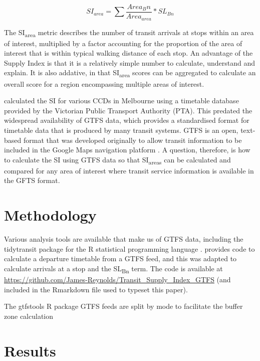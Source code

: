 \documentclass[numbered]{trbunofficial}
\begin{document}
\begin{equation}
\label{eq:supply_index}
  SI_{area} = \sum{\frac{Area{_Bn}}{Area_{area}}*SL_{Bn}}
\end{equation}

The SI\textsubscript{area} metric describes the number of transit
arrivals at stops within an area of interest, multiplied by a factor
accounting for the proportion of the area of interest that is within
typical walking distance of each stop. An advantage of the Supply Index
is that it is a relatively simple number to calculate, understand and
explain. It is also addative, in that SI\textsubscript{area} scores can
be aggregated to calculate an overall score for a region encompassing
multiple areas of interest.

\citet{currie2007identifying} calculated the SI for various CCDs in
Melbourne using a timetable database provided by the Victorian Public
Transport Authority (PTA). This predated the widespread availability of
GTFS data, which provides a standardised format for timetable data that
is produced by many transit systems. GTFS is an open, text-based format
that was developed originally to allow transit information to be
included in the Google Maps navigation platform \citep{GTFS}. A
question, therefore, is how to calculate the SI using GTFS data so that
SI\textsubscript{areas} can be calculated and compared for any area of
interest where transit service information is available in the GFTS
format.

\hypertarget{methodology}{%
\section{Methodology}\label{methodology}}

Various analysis tools are available that make us of GTFS data,
including the tidytransit package \citep{tidytransit2023} for the R
statistical programming language \citep{R-base}.
\citet{tidytransit_departure_timetable} provides code to calculate a
departure timetable from a GTFS feed, and this was adapted to calculate
arrivals at a stop and the SL\textsubscript{Bn} term. The code is
available at
\url{https://github.com/James-Reynolds/Transit_Supply_Index_GTFS} (and
included in the Rmarkdown file used to typeset this paper).

The gtfstools R package GTFS feeds are split by mode to facilitate the
buffer zone calculation

\hypertarget{results}{%
\section{Results}\label{results}}
\end{document}
